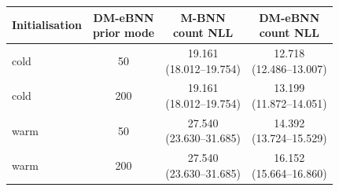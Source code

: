 \begin{tabular}{lccc}
\toprule
Initialisation & \shortstack{DM-eBNN\\prior mode} & \shortstack{M-BNN\\count NLL} & \shortstack{DM-eBNN\\count NLL} \\
\midrule
cold & 50 & \shortstack{19.161\\(18.012--19.754)} & \shortstack{12.718\\(12.486--13.007)} \\
cold & 200 & \shortstack{19.161\\(18.012--19.754)} & \shortstack{13.199\\(11.872--14.051)} \\
\midrule
warm & 50 & \shortstack{27.540\\(23.630--31.685)} & \shortstack{14.392\\(13.724--15.529)} \\
warm & 200 & \shortstack{27.540\\(23.630--31.685)} & \shortstack{16.152\\(15.664--16.860)} \\
\bottomrule
\end{tabular}
